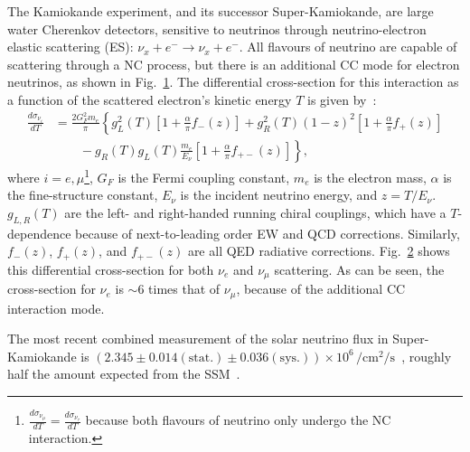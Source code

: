 The Kamiokande experiment, and its successor Super-Kamiokande, are large water Cherenkov detectors, sensitive to neutrinos through neutrino-electron elastic scattering (ES): $\nu_{x} + e^{-}\to\nu_{x} + e^{-}$. All flavours of neutrino are capable of scattering through a NC process, but there is an additional CC mode for electron neutrinos, as shown in Fig.~\ref{fig:nu_e_es_feynman_diagrams}. The differential cross-section for this interaction as a function of the scattered electron's kinetic energy $T$ is given by~\cite{bahcallSolarNeutrinosRadiative1995}: %
\begin{align}\label{eq:enu_es_xsec}
    \frac{d\sigma_{\nu_{i}}}{dT} &= \frac{2G_{F}^{2}m_{e}}{\pi}\left\{
        g_{L}^{2}(T)\left[
            1 + \frac{\alpha}{\pi}f_{-}(z)
        \right]
        + g_{R}^{2}(T)(1-z)^{2}\left[
            1 + \frac{\alpha}{\pi}f_{+}(z)
        \right]\right.\nonumber\\
        &\qquad \left. {}
        -g_{R}(T)g_{L}(T)\frac{m_{e}}{E_{\nu}}\left[
            1 + \frac{\alpha}{\pi}f_{+-}(z)
        \right]
    \right\},
\end{align}
where $i = e, \mu$\footnote{
    $\frac{d\sigma_{\nu_{\mu}}}{dT} = \frac{d\sigma_{\nu_{\tau}}}{dT}$ because both flavours of neutrino only undergo the NC interaction.
}, $G_{F}$ is the Fermi coupling constant, $m_{e}$ is the electron mass, $\alpha$ is the fine-structure constant, $E_{\nu}$ is the incident neutrino energy, and $z = T/E_{\nu}$. $g_{L,R}(T)$ are the left- and right-handed running chiral couplings, which have a $T$-dependence because of next-to-leading order EW and QCD corrections. Similarly, $f_{-}(z)$, $f_{+}(z)$, and $f_{+-}(z)$ are all QED radiative corrections. Fig.~\ref{fig:nu_e_es_xsec} shows this differential cross-section for both $\nu_{e}$ and $\nu_{\mu}$ scattering. As can be seen, the cross-section for $\nu_{e}$ is $\sim 6$ times that of $\nu_{\mu}$, because of the additional CC interaction mode.

\begin{figure}
    \centering
    \caption[]{}
    \label{fig:nu_e_es_feynman_diagrams}
\end{figure}

\begin{figure}
    \centering
    \caption[]{}
    \label{fig:nu_e_es_xsec}
\end{figure}

The most recent combined measurement of the \beight{} solar neutrino flux in Super-Kamiokande is $(2.345\pm0.014(\mathrm{stat.})\pm0.036(\mathrm{sys.}))\times10^{6}\,\si{\per\cm\squared\per\second}$~\cite{abeSolarNeutrinoMeasurements2016}, roughly half the amount expected from the SSM~\cite{vinyolesB16StandardSolar2018}.

